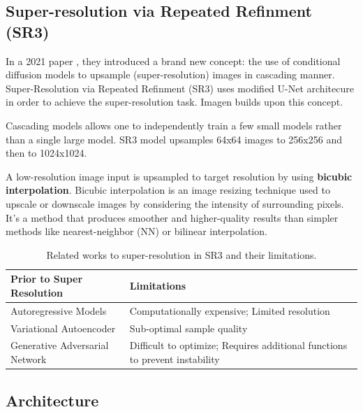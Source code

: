 \subsection{Super-resolution via Repeated Refinment (SR3)}

\label{subsec:imagen_sr3}

In a 2021 paper \cite{sr3}, they introduced a brand new concept: the use of conditional diffusion models to upsample (super-resolution) images in cascading manner. Super-Resolution via Repeated Refinment (SR3) uses modified U-Net architecure in order to achieve the super-resolution task. Imagen builds upon this concept.

Cascading models allows one to independently train a few small models rather than a single large model. SR3 model upsamples 64x64 images to 256x256 and then to 1024x1024. 

A low-resolution image input is upsampled to target resolution by using \textbf{bicubic interpolation}. Bicubic interpolation is an image resizing technique used to upscale or downscale images by considering the intensity of surrounding pixels. It's a method that produces smoother and higher-quality results than simpler methods like nearest-neighbor (NN) or bilinear interpolation.


\begin{table}[h!]
    \centering
    \begin{tabular}{|l|m{8cm}|}
        \hline
        \textbf{Prior to Super Resolution} & \textbf{Limitations} \\ \hline
        Autoregressive Models           & Computationally expensive; Limited resolution \\ \hline
        Variational Autoencoder         & Sub-optimal sample quality \\ \hline
        Generative Adversarial Network  & Difficult to optimize; Requires additional functions to prevent instability \\ \hline
    \end{tabular}
    \caption{Related works to super-resolution in SR3 and their limitations.}
\end{table}











\subsection{Architecture}

